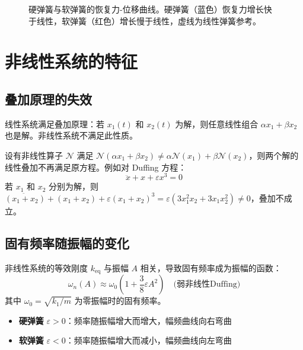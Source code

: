 \begin{figure}[H]
\centering
{}
\caption{硬弹簧与软弹簧的恢复力-位移曲线。硬弹簧（蓝色）恢复力增长快于线性，软弹簧（红色）增长慢于线性，虚线为线性弹簧参考。}
\label{fig:ch10_spring_force}
\end{figure}

\section{非线性系统的特征}
\subsection{叠加原理的失效}
线性系统满足叠加原理：若 $x_1(t)$ 和 $x_2(t)$ 为解，则任意线性组合 $\alpha x_1 + \beta x_2$ 也是解。非线性系统不满足此性质。

\begin{definition}[叠加原理失效]
设有非线性算子 $\mathcal{N}$ 满足 $\mathcal{N}(\alpha x_1 + \beta x_2) \neq \alpha\mathcal{N}(x_1) + \beta\mathcal{N}(x_2)$，则两个解的线性叠加不再满足原方程。例如对 Duffing 方程：
\[
\ddot{x} + x + \varepsilon x^{3} = 0
\]
若 $x_1$ 和 $x_2$ 分别为解，则 $\ddot{(x_1+x_2)} + (x_1+x_2) + \varepsilon(x_1+x_2)^{3} = \varepsilon(3x_1^{2}x_2 + 3x_1 x_2^{2}) \neq 0$，叠加不成立。
\end{definition}

\subsection{固有频率随振幅的变化}
非线性系统的等效刚度 $k_{\text{eq}}$ 与振幅 $A$ 相关，导致固有频率成为振幅的函数：
\[
\omega_n(A) \approx \omega_0 \left(1 + \frac{3}{8}\varepsilon A^{2}\right) \quad \text{(弱非线性Duffing)}
\]
其中 $\omega_0 = \sqrt{k_1/m}$ 为零振幅时的固有频率。
\begin{itemize}
    \item \textbf{硬弹簧} $\varepsilon > 0$：频率随振幅增大而增大，幅频曲线向右弯曲
    \item \textbf{软弹簧} $\varepsilon < 0$：频率随振幅增大而减小，幅频曲线向左弯曲
\end{itemize}

